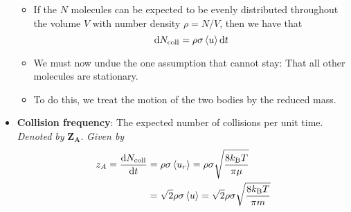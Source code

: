 \documentclass[../notes.tex]{subfiles}
\begin{document}
\begin{itemize}
\begin{itemize}
        \item If the $N$ molecules can be expected to be evenly distributed throughout the volume $V$ with number density $\rho=N/V$, then we have that
        \begin{equation*}
            \dd{N_\text{coll}} = \rho\sigma\left\langle{u}\right\rangle\dd{t}
        \end{equation*}
        \item We must now undue the one assumption that cannot stay: That all other molecules are stationary.
        \item To do this, we treat the motion of the two bodies by the reduced mass.
    \end{itemize}
    \item \textbf{Collision frequency}: The expected number of collisions per unit time. \emph{Denoted by} $\bm{Z_A}$. \emph{Given by}
    \begin{align*}
        z_A = \dv{N_\text{coll}}{t}
        &= \rho\sigma\left\langle{u_r}\right\rangle
            = \rho\sigma\sqrt{\frac{8k_\text{B} T}{\pi\mu}}\\
        &= \sqrt{2}\rho\sigma\left\langle{u}\right\rangle
        = \sqrt{2}\rho\sigma\sqrt{\frac{8k_\text{B} T}{\pi m}}
    \end{align*}
\end{itemize}
\end{document}
